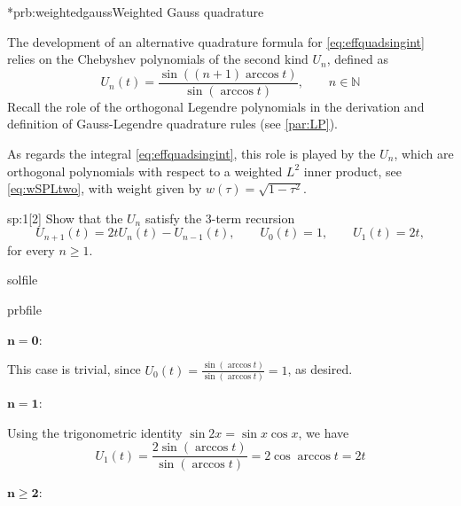 
\begin{samproblem}*{prb:weightedgauss}{Weighted Gauss quadrature}{
  The development of an alternative quadrature formula for \eqref{eq:effquadsingint} relies on the Chebyshev polynomials of the second kind $U_n$, defined as
  \begin{equation*}
    U_n(t)=\frac{\sin((n+1)\arccos t)}{\sin(\arccos t)}, \qquad n\in\mathbb{N}
  \end{equation*}
  Recall the role of the orthogonal Legendre polynomials in the derivation and definition of Gauss-Legendre quadrature rules (see \cref{par:LP}).

  As regards the integral \eqref{eq:effquadsingint}, this role is played by the $U_n$, which are orthogonal polynomials with respect to a 
  weighted $L^2$ inner product, see \cref{eq:wSPLtwo}, with weight given by $w(\tau)=\sqrt{1-\tau^2}$.
}

\begin{subproblem}{sp:1}[2]
  Show that the $U_n$ satisfy the 3-term recursion
  \begin{equation*}
    U_{n+1}(t)=2tU_n(t)-U_{n-1}(t),\qquad U_0(t)=1,\qquad U_1(t)=2t,
  \end{equation*}
  for every $n\ge 1$.

  \begin{samwriteprbpart}{solfile}
    \begin{writeverbatim}{prbfile}
      \begin{samsolution}
        $\mathbf{n=0}$:

        This case is trivial, since $U_0(t)=\frac{\sin(\arccos t)}{\sin(\arccos t)}=1$, as desired. 

        $\mathbf{n=1}$:

        Using the trigonometric identity $\sin 2x = \sin x \cos x$, we have 
        \begin{equation*}
          U_1(t)=\frac{2\sin(\arccos t)}{\sin(\arccos t)}=2\cos \arccos t = 2t
        \end{equation*}

        $\mathbf{n \ge 2}$:


\end{samsolution}
\end{writeverbatim}
\end{samwriteprbpart}
\end{subproblem}
\end{samproblem}
